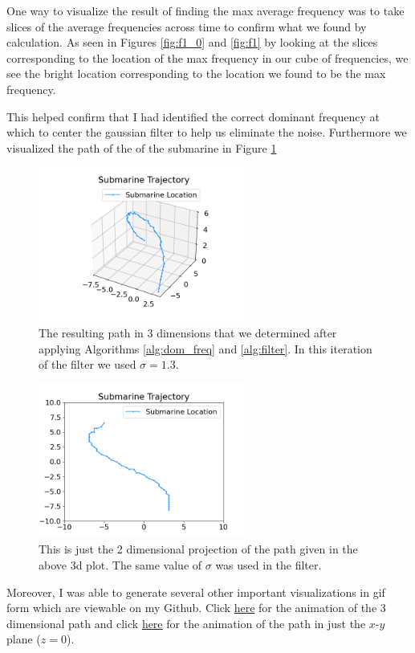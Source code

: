 \documentclass[11pt]{amsart}
\begin{document}
One way to visualize the result of finding the max average frequency was to take slices of the average frequencies across time to confirm what we found by calculation.
As seen in Figures \ref{fig:f1_0} and \ref{fig:f1} by looking at the slices corresponding to the location of the max frequency in our cube of frequencies, we see the bright location corresponding to the location we found to be the max frequency.

This helped confirm that I had identified the correct dominant frequency at which to center the gaussian filter to help us eliminate the noise.
Furthermore we visualized the path of the of the submarine in Figure \ref{fig:f2}

\begin{figure}[h]
	\centering
	\includegraphics[height=2in]{../visualizations/submarine_static_3d.png}
 	\caption{The resulting path in 3 dimensions that we determined after applying Algorithms \ref{alg:dom_freq} and \ref{alg:filter}. In this iteration of the filter we used $\sigma=1.3$.}\label{fig:f2}
\end{figure}

\begin{figure}[h]
	\centering
	\includegraphics[height=2in]{../visualizations/submarine_static_2d.png}
 	\caption{This is just the 2 dimensional projection of the path given in the above 3d plot. The same value of $\sigma$ was used in the filter.}\label{fig:f3}
\end{figure}

Moreover, I was able to generate several other important visualizations in gif form which are viewable on my Github.
Click \href{https://github.com/hunter-lybbert/uw-central/blob/data-analysis-hw-1/data_analysis/hw_01/visualizations/submarine_trajectory_3d.gif}{here} for the animation of the 3 dimensional path and click \href{https://github.com/hunter-lybbert/uw-central/blob/data-analysis-hw-1/data_analysis/hw_01/visualizations/submarine_trajectory_2d.gif}{here} for the animation of the path in just the $x$-$y$ plane ($z = 0$).
\end{document}
